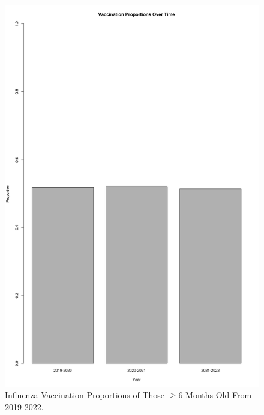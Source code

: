 \documentclass[12pt]{article}
\begin{document}
\begin{figure}[ht!]
  \centering
  \includegraphics[width= 125mm ,scale=.5]{plot.png}
  \caption{Influenza Vaccination Proportions of Those $\ge 6$ Months Old From 2019-2022.}
  \label{fig:years}
\end{figure}
\end{document}
